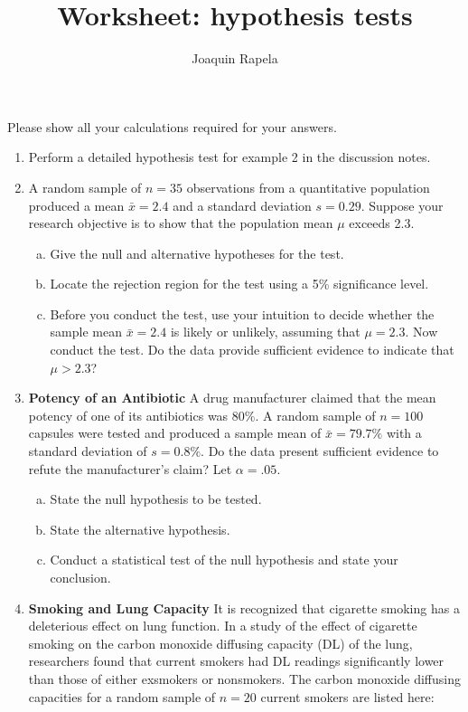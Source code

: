 \documentclass[12pt]{article}
\title{Worksheet: hypothesis tests}
\author{Joaquin Rapela}
\begin{document}
\maketitle

Please show all your calculations required for your answers.

\begin{enumerate}

    \item Perform a detailed hypothesis test for example 2 in the discussion
        notes.

	\item A random sample of $n=35$ observations from a quantitative population
produced a mean $\bar{x}=2.4$ and a standard deviation $s=0.29$. Suppose your
research objective is to show that the population mean $\mu$ exceeds 2.3.

		\begin{enumerate}[(a)]
			\item Give the null and alternative hypotheses for the test.
			\item Locate the rejection region for the test using a 5\% signiﬁcance level.
			\item Before you conduct the test, use your intuition to decide
whether the sample mean $\bar{x}=2.4$ is likely or unlikely, assuming that
$\mu=2.3$. Now conduct the test. Do the data provide sufficient evidence to
indicate that $\mu>2.3$? 
		\end{enumerate}

	\item \textbf{Potency of an Antibiotic} A drug manufacturer claimed that the mean
	potency of one of its antibiotics was 80\%. A random sample of $n=100$
	capsules were tested and produced a sample mean of $\bar{x}=79.7\%$ with a
	standard deviation of $s=0.8\%$. Do the data present sufficient evidence to
	refute the manufacturer’s claim? Let $\alpha=.05$.

		\begin{enumerate}[(a)]
			\item State the null hypothesis to be tested.
			\item State the alternative hypothesis.
			\item Conduct a statistical test of the null hypothesis and state your conclusion.
		\end{enumerate}

	\item \textbf{Smoking and Lung Capacity} It is recognized that cigarette smoking has a deleterious effect on lung function. In a study of the effect of cigarette smoking on the carbon monoxide diffusing capacity (DL) of the lung, researchers found that current smokers had DL readings signiﬁcantly lower than those of either exsmokers or nonsmokers. The carbon monoxide diffusing capacities for a random sample of $n=20$ current smokers are listed here:


\end{enumerate}
\end{document}
